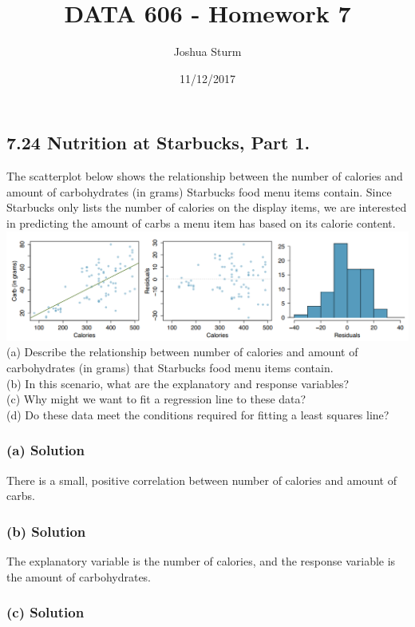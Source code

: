 \documentclass[]{article}
\title{DATA 606 - Homework 7}
\author{Joshua Sturm}
\date{11/12/2017}
\begin{document}
\maketitle

\subsection{7.24 Nutrition at Starbucks, Part
1.}\label{nutrition-at-starbucks-part-1.}

The scatterplot below shows the relationship between the number of
calories and amount of carbohydrates (in grams) Starbucks food menu
items contain. Since Starbucks only lists the number of calories on the
display items, we are interested in predicting the amount of carbs a
menu item has based on its calorie content. \includegraphics{7.24.PNG}
(a) Describe the relationship between number of calories and amount of
carbohydrates (in grams) that Starbucks food menu items contain.\\
(b) In this scenario, what are the explanatory and response variables?\\
(c) Why might we want to fit a regression line to these data?\\
(d) Do these data meet the conditions required for fitting a least
squares line?

\subsubsection{(a) Solution}\label{a-solution}

There is a small, positive correlation between number of calories and
amount of carbs.

\subsubsection{(b) Solution}\label{b-solution}

The explanatory variable is the number of calories, and the response
variable is the amount of carbohydrates.

\subsubsection{(c) Solution}\label{c-solution}
\end{document}
